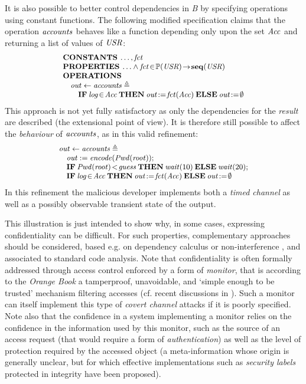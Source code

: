 \documentclass[conference]{IEEEtran}
\begin{document}
It is also possible to better control dependencies in \emph{B} by specifying operations using
constant functions. The following modified specification claims that the operation
{\small$\textrm{\emph{accounts}}$} behaves like a function depending only upon the set
{\small$\textrm{\emph{Acc}}$} and returning a list of values of {\small$\textrm{\emph{USR}}$}:
\[\small\begin{array}{l}
\Cmd{CONSTANTS}\:\ldots,\fid{fct}\\
\Cmd{PROPERTIES}\:
 \ldots\land\fid{fct}\!\in\!\mathbb{P}(\fid{USR})\!\to\!\Cmd{seq}(\fid{USR})\\
\Cmd{OPERATIONS}\\
\quad \fid{out}\gets\fid{accounts}\triangleq\\
\quad\quad\Cmd{IF}\:\fid{log}\!\in\!\fid{Acc}\:\Cmd{THEN}\:\fid{out}\!:=\!\fid{fct}(\fid{Acc})
 \:\Cmd{ELSE}\:\fid{out}\!:=\!\emptyset\\
\end{array}\]
This approach is not yet fully satisfactory as only the dependencies for the \emph{result} are
described (the extensional point of view). It is therefore still possible to affect the
\emph{behaviour} of {\small$\textrm{\emph{accounts}}$}, as in this valid refinement:
\[\small\begin{array}{l}
\fid{out}\gets\fid{accounts}\triangleq\\
\quad\fid{out}:=\fid{encode}(\fid{Pwd}(\fid{root}));\\
\quad \Cmd{IF}\:\fid{Pwd}(\fid{root})\!<\!\fid{guess}
 \:\Cmd{THEN}\:\fid{wait}(10)\:\Cmd{ELSE}\:\fid{wait}(20);\\
\quad\Cmd{IF}\:\fid{log}\!\in\!\fid{Acc}\:\Cmd{THEN}\:\fid{out}\!:=\!\fid{fct}(\fid{Acc})
 \:\Cmd{ELSE}\:\fid{out}\!:=\!\emptyset\\
\end{array}\]
In this refinement the malicious developer implements both a \emph{timed channel} as well as
a possibly observable transient state of the output.

This illustration is just intended to show why, in some cases, expressing confidentiality
can be difficult. For such properties, complementary approaches should be considered, based
e.g. on dependency calculus or non-interference \cite{abadi99core,goguen82}, and associated to
standard code analysis. Note that confidentiality is often formally addressed through access
control enforced by a form of \emph{monitor}, that is according to the \emph{Orange Book} a
tamperproof, unavoidable, and `simple enough to be trusted' mechanism filtering accesses (cf.
recent discussions in
\cite{DBLP:conf/b/BenaissaCM07,DBLP:conf/b/Haddad07,DBLP:conf/b/HoffmannHGB07}). Such a
monitor can itself implement this type of \emph{covert channel} attacks if it is poorly
specified. Note also that the confidence in a system implementing a monitor relies on the
confidence in the information used by this monitor, such as the source of an access request
(that would require a form of \emph{authentication}) as well as the level of protection
required by the accessed object (a meta-information whose origin is generally unclear, but for
which effective implementations such as \emph{security labels} protected in integrity have
been proposed).
\end{document}
